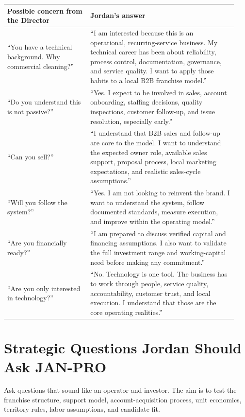 \documentclass[11pt]{article}
\newcommand{\janpro}{JAN-PRO}
\begin{document}
\begin{longtable}{>{\raggedright\arraybackslash}p{0.34\linewidth}>{\raggedright\arraybackslash}p{0.60\linewidth}}
\toprule
\textbf{Possible concern from the Director} & \textbf{Jordan's answer} \\
\midrule
``You have a technical background. Why commercial cleaning?'' & ``I am interested because this is an operational, recurring-service business. My technical career has been about reliability, process control, documentation, governance, and service quality. I want to apply those habits to a local B2B franchise model.'' \\
``Do you understand this is not passive?'' & ``Yes. I expect to be involved in sales, account onboarding, staffing decisions, quality inspections, customer follow-up, and issue resolution, especially early.'' \\
``Can you sell?'' & ``I understand that B2B sales and follow-up are core to the model. I want to understand the expected owner role, available sales support, proposal process, local marketing expectations, and realistic sales-cycle assumptions.'' \\
``Will you follow the system?'' & ``Yes. I am not looking to reinvent the brand. I want to understand the system, follow documented standards, measure execution, and improve within the operating model.'' \\
``Are you financially ready?'' & ``I am prepared to discuss verified capital and financing assumptions. I also want to validate the full investment range and working-capital need before making any commitment.'' \\
``Are you only interested in technology?'' & ``No. Technology is one tool. The business has to work through people, service quality, accountability, customer trust, and local execution. I understand that those are the core operating realities.'' \\
\bottomrule
\end{longtable}

\section{Strategic Questions Jordan Should Ask \janpro{}}

Ask questions that sound like an operator and investor. The aim is to test the franchise structure, support model, account-acquisition process, unit economics, territory rules, labor assumptions, and candidate fit.
\end{document}
